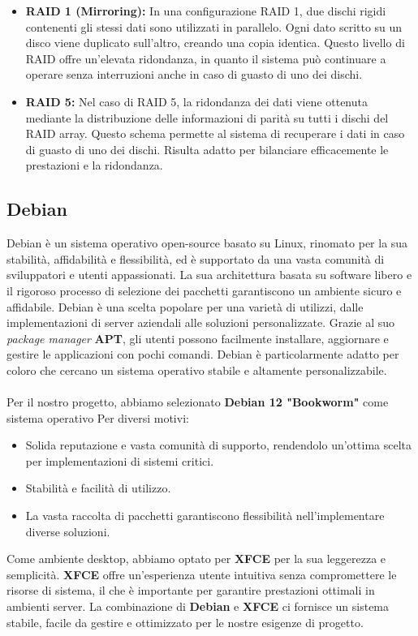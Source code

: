\documentclass[11pt]{article}
\begin{document}
\begin{itemize}
    \item \textbf{RAID 1 (Mirroring):} In una configurazione RAID 1, due dischi rigidi contenenti gli stessi dati sono utilizzati in parallelo. Ogni dato scritto su un disco viene duplicato sull'altro, creando una copia identica. Questo livello di RAID offre un'elevata ridondanza, in quanto il sistema può continuare a operare senza interruzioni anche in caso di guasto di uno dei dischi.

    \item \textbf{RAID 5:} Nel caso di RAID 5, la ridondanza dei dati viene ottenuta mediante la distribuzione delle informazioni di parità su tutti i dischi del RAID array. Questo schema permette al sistema di recuperare i dati in caso di guasto di uno dei dischi. Risulta adatto per bilanciare efficacemente le prestazioni e la ridondanza.
\end{itemize}

\pagebreak

\subsection{Debian}
Debian è un sistema operativo open-source basato su Linux, rinomato per la sua stabilità, affidabilità e flessibilità, ed è supportato da una vasta comunità di sviluppatori e utenti appassionati. La sua architettura basata su software libero e il rigoroso processo di selezione dei pacchetti garantiscono un ambiente sicuro e affidabile. Debian è una scelta popolare per una varietà di utilizzi, dalle implementazioni di server aziendali alle soluzioni personalizzate. Grazie al suo \textit{package manager} \textbf{APT}, gli utenti possono facilmente installare, aggiornare e gestire le applicazioni con pochi comandi. Debian è particolarmente adatto per coloro che cercano un sistema operativo stabile e altamente personalizzabile.
\\\\
Per il nostro progetto, abbiamo selezionato \textbf{Debian 12 "Bookworm"} come sistema operativo Per diversi motivi:
\begin{itemize}
    \item Solida reputazione e vasta comunità di supporto, rendendolo un'ottima scelta per implementazioni di sistemi critici.
    \item Stabilità e facilità di utilizzo.
    \item La vasta raccolta di pacchetti garantiscono flessibilità nell'implementare diverse soluzioni.
\end{itemize}
Come ambiente desktop, abbiamo optato per \textbf{XFCE} per la sua leggerezza e semplicità. \textbf{XFCE} offre un'esperienza utente intuitiva senza compromettere le risorse di sistema, il che è importante per garantire prestazioni ottimali in ambienti server. La combinazione di \textbf{Debian} e \textbf{XFCE} ci fornisce un sistema stabile, facile da gestire e ottimizzato per le nostre esigenze di progetto.
\end{document}
